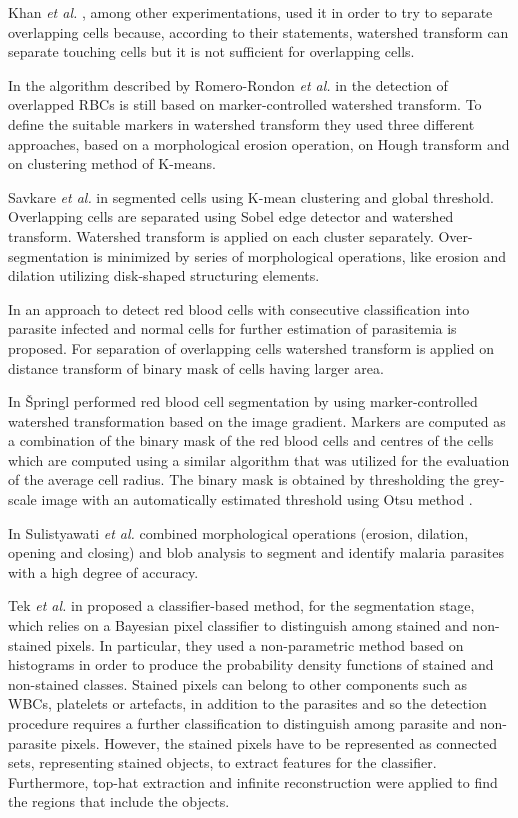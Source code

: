 \documentclass[sensors,review,submit,moreauthors,pdftex,10pt,a4paper]{mdpi}
\begin{document}
Khan \emph{et al.} \cite{Khan2011}, among other experimentations, used it in order to try to separate overlapping cells because, according to their statements, watershed transform can separate touching cells but it is not sufficient for overlapping cells.

In the algorithm described by Romero-Rondon \emph{et al.} in \cite{Romero2016} the detection of overlapped RBCs is still based on marker-controlled watershed transform. To define the suitable markers in watershed transform they used three different approaches, based on a morphological erosion operation, on Hough transform and on clustering method of K-means.

Savkare \emph{et al.} in \cite{Savkare2015} segmented cells using K-mean clustering and global threshold. Overlapping cells are separated using Sobel edge detector and watershed transform. Watershed transform is applied on each cluster separately. Over-segmentation is minimized by series of morphological operations, like erosion and dilation utilizing disk-shaped structuring elements.

In \cite{Savkare2011a} an approach  to detect red blood cells with consecutive classification into parasite infected and normal cells for further estimation of parasitemia is proposed. For separation of overlapping cells watershed transform is applied on distance transform of binary mask of cells having larger area.

In \cite{Springl2009} {\v{S}}pringl performed red blood cell segmentation by using marker-controlled watershed transformation based on the image gradient. Markers are computed as a combination of the binary mask of the red blood cells and centres of the cells which are computed using a similar algorithm that was utilized for the evaluation of the average cell radius. The binary mask is obtained by thresholding the grey-scale image with an automatically estimated threshold using Otsu method \cite{Otsu1975}.

In \cite{Sulist2015} Sulistyawati \emph{et al.} combined morphological operations (erosion, dilation, opening and closing) and blob analysis to segment and identify malaria parasites with a high degree of accuracy.

Tek \emph{et al.} in \cite{Tek2006} proposed a classifier-based method, for the segmentation stage, which relies on a Bayesian pixel classifier to distinguish among stained and non-stained pixels. In particular, they used a non-parametric method based on histograms in order to produce the probability density functions of stained and non-stained classes. Stained pixels can belong to other components such as WBCs, platelets or artefacts, in addition to the parasites and so the detection procedure requires a further classification to distinguish among parasite and non-parasite pixels. However, the stained pixels have to be represented as connected sets, representing stained objects, to extract features for the classifier. Furthermore, top-hat extraction and infinite reconstruction were applied to find the regions that include the objects.
\end{document}
